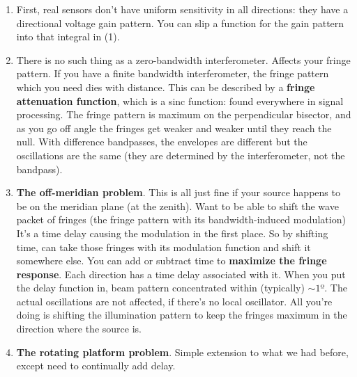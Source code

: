 \documentclass[a4paper]{article}
\begin{document}
\begin{enumerate}

\item First, real sensors don't have uniform sensitivity in all directions: they have a directional voltage gain pattern. You can slip a function for the gain pattern into that integral in (1).

\item There is no such thing as a zero-bandwidth interferometer. Affects your fringe pattern. If you have a finite bandwidth interferometer, the fringe pattern which you need dies with distance. This can be described by a \textbf{fringe attenuation function}, which is a sinc function: found everywhere in signal processing. The fringe pattern is maximum on the perpendicular bisector, and as you go off angle the fringes get weaker and weaker until they reach the null. With difference bandpasses, the envelopes are different but the oscillations are the same (they are determined by the interferometer, not the bandpass).

\item \textbf{The off-meridian problem}. This is all just fine if your source happens to be on the meridian plane (at the zenith). Want to be able to shift the wave packet of fringes (the fringe pattern with its bandwidth-induced modulation) It's a time delay causing the modulation in the first place. So by shifting time, can take those fringes with its modulation function and shift it somewhere else. You can add or subtract time to \textbf{maximize the fringe response}. Each direction has a time delay associated with it. When you put the delay function in, beam pattern concentrated within (typically) $\sim 1$º. The actual oscillations are not affected, if there's no local oscillator. All you're doing is shifting the illumination pattern to keep the fringes maximum in the direction where the source is. 

\item \textbf{The rotating platform problem}. Simple extension to what we had before, except need to continually add delay. 


\end{enumerate}
\end{document}
